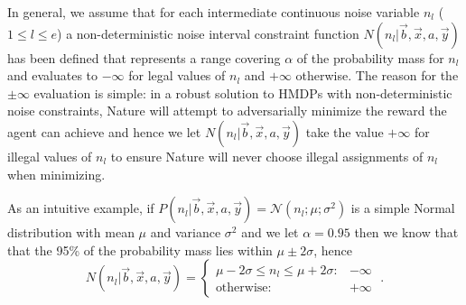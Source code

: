 In general, we assume that for each intermediate continuous noise variable 
$n_l$ ($1 \leq l \leq e$)
a non-deterministic noise interval constraint function $N(n_l| \vec{b},\vec{x},a,\vec{y})$ 
has been defined 
that represents a range covering $\alpha$ of the probability mass for $n_l$ and evaluates to 
$-\infty$ for legal values of $n_l$ and $+\infty$ otherwise.  The reason for
the $\pm \infty$ evaluation is simple: 
in a robust solution to HMDPs with non-deterministic noise constraints, Nature will
attempt to adversarially minimize the reward the agent can achieve and hence we let
$N(n_l| \vec{b},\vec{x},a,\vec{y})$ take the value $+\infty$ for illegal values
of $n_l$ to ensure Nature will never choose illegal assignments of $n_l$ when minimizing.

As an intuitive example, if 
$P(n_l| \vec{b},\vec{x},a,\vec{y}) = \mathcal{N}(n_l; \mu; \sigma^2)$
is a simple Normal distribution with mean $\mu$ and variance $\sigma^2$ and we let $\alpha = 0.95$ 
then we know that that the 95\% of the probability mass
lies within $\mu \pm 2\sigma$, hence
\begin{equation*}
N(n_l| \vec{b},\vec{x},a,\vec{y}) = 
\begin{cases}
\mu - 2\sigma \leq n_l \leq \mu + 2 \sigma: & -\infty \\
\text{otherwise} : & +\infty 
\end{cases} \; .
\end{equation*}

